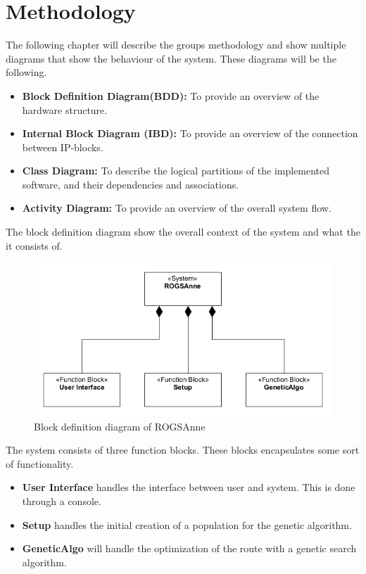 
\chapter{Methodology}
The following chapter will describe the groups methodology and show multiple diagrams that show the behaviour of the system. These diagrams will be the following.

\begin{itemize}
	\item\textbf{Block Definition Diagram(BDD):} To provide an overview of the hardware structure.
	
	\item \textbf{Internal Block Diagram (IBD):} To provide an overview of the connection between IP-blocks.
	
	\item \textbf{Class Diagram:} To describe the logical partitions of the implemented software, and their dependencies and associations.
	
	\item \textbf{Activity Diagram:} To provide an overview of the overall system flow.
\end{itemize}

The block definition diagram show the overall context of the system and what the it consists of. 

\begin{figure}[H]
	\centering
	\includegraphics[width=\textwidth]{Images/BDD.png}
	\caption{Block definition diagram of ROGSAnne}
	\label{fig:BDD}
\end{figure}

The system consists of three function blocks. These blocks encapsulates some sort of functionality.

\begin{itemize}
	\item \textbf{User Interface} handles the interface between user and system. This is done through a console.
	\item \textbf{Setup} handles the initial creation of a population for the genetic algorithm. 
	\item \textbf{GeneticAlgo} will handle the optimization of the route with a genetic search algorithm.
\end{itemize}

